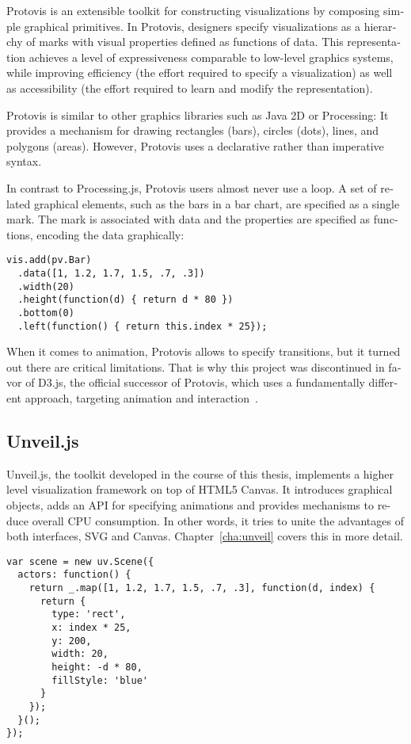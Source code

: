 \begin{english}
Protovis is an extensible toolkit for constructing visualizations by composing simple graphical primitives. In Protovis, designers specify visualizations as a hierarchy of marks with visual properties defined as functions of data. This representation achieves a level of expressiveness comparable to low-level graphics systems, while improving efficiency (the effort required to specify a visualization) as well as accessibility (the effort required to learn and modify the representation).

Protovis is similar to other graphics libraries such as Java 2D or Processing: It provides a mechanism for drawing rectangles (bars), circles (dots), lines, and polygons (areas). However, Protovis uses a declarative rather than imperative syntax.

In contrast to Processing.js, Protovis users almost never use a loop. A set of related graphical elements, such as the bars in a bar chart, are specified as a single mark. The mark is associated with data and the properties are specified as functions, encoding the data graphically:

\begin{verbatim}
vis.add(pv.Bar)
  .data([1, 1.2, 1.7, 1.5, .7, .3])
  .width(20)
  .height(function(d) { return d * 80 })
  .bottom(0)
  .left(function() { return this.index * 25});
\end{verbatim}

When it comes to animation, Protovis allows to specify transitions, but it turned out there are critical limitations. That is why this project was discontinued in favor of D3.js, the official successor of Protovis, which uses a fundamentally different approach, targeting animation and interaction~\cite{D3}.


\subsection{Unveil.js}

Unveil.js, the toolkit developed in the course of this thesis, implements a higher level visualization framework on top of HTML5 Canvas. It introduces graphical objects, adds an API for specifying animations and provides mechanisms to reduce overall CPU consumption. In other words, it tries to unite the advantages of both interfaces, SVG and Canvas. Chapter~\ref{cha:unveil} covers this in more detail.

\begin{verbatim}
var scene = new uv.Scene({
  actors: function() {
    return _.map([1, 1.2, 1.7, 1.5, .7, .3], function(d, index) {
      return {
        type: 'rect',
        x: index * 25,
        y: 200,
        width: 20,
        height: -d * 80,
        fillStyle: 'blue'
      }
    });
  }();
});
\end{verbatim}



\end{english}
